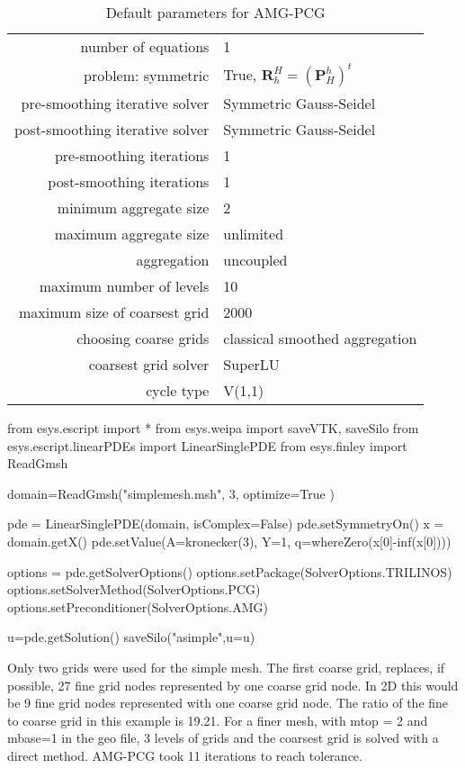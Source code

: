 \begin{table}\center
\begin{tabular}{|r|l|}
\hline
    number of equations & 1\\
    problem: symmetric & True, $\mathbf{R}_h^H = (\mathbf{P}^h_H)^t$ \\
    pre-smoothing iterative solver & Symmetric Gauss-Seidel\\
    post-smoothing iterative solver & Symmetric Gauss-Seidel\\
    pre-smoothing iterations & 1 \\
    post-smoothing iterations & 1 \\
    minimum aggregate size & 2 \\
    maximum aggregate size & unlimited \\
    aggregation & uncoupled \\
    maximum number of levels & 10\\
    maximum size of coarsest grid & 2000\\
    choosing coarse grids & classical smoothed aggregation\\
    coarsest grid solver &  SuperLU\\
    cycle type & V(1,1) \\
    \hline
\end{tabular}\caption{Default parameters for AMG-PCG}\label{defaultAMG}
\end{table}


\begin{python}[caption=basic Trilinos PCG-AMG defaults only script, label=basicAMG ]
from esys.escript import *
from esys.weipa import saveVTK, saveSilo
from esys.escript.linearPDEs import LinearSinglePDE
from esys.finley import ReadGmsh

domain=ReadGmsh("simplemesh.msh", 3,  optimize=True )

pde = LinearSinglePDE(domain, isComplex=False)
pde.setSymmetryOn()
x = domain.getX()
pde.setValue(A=kronecker(3), Y=1, q=whereZero(x[0]-inf(x[0])))

options = pde.getSolverOptions()
options.setPackage(SolverOptions.TRILINOS)
options.setSolverMethod(SolverOptions.PCG)
options.setPreconditioner(SolverOptions.AMG)

u=pde.getSolution()    
saveSilo("asimple",u=u)    
\end{python}

Only two grids were used for the simple mesh.  The first coarse grid, replaces, if possible, 27 fine grid nodes represented by  one coarse grid node.  In 2D this would be 9 fine grid nodes represented with one coarse grid node. The ratio of the fine to coarse grid in this example is 19.21.  For a finer mesh, with mtop = 2 and mbase=1 in the geo file, 3 levels of grids and the coarsest grid is solved with a direct method.  AMG-PCG took 11 iterations to reach tolerance.

